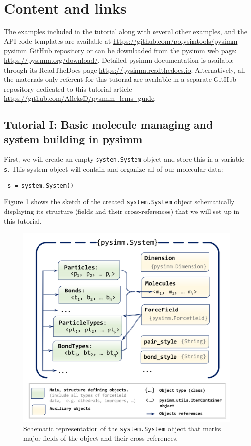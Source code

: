 \documentclass[9pt,tutorial]{livecoms}
\newcommand{\githubrepository}{\url{https://github.com/AlleksD/pysimm_lcms_guide}}
\begin{document}
\section{Content and links}
The examples included in the tutorial along with several other examples, and the API code templates are available at \url{https://github.com/polysimtools/pysimm} pysimm GitHub repository or can be downloaded from the pysimm web page: \url{https://pysimm.org/download/}. 
Detailed pysimm documentation is available through its ReadTheDocs page \url{https://pysimm.readthedocs.io}.
Alternatively, all the materials only referent for this tutorial are available in a separate GitHub repository dedicated to this tutorial article \githubrepository.  


\subsection{Tutorial I: Basic molecule managing and system building in pysimm}

First, we will create an empty \lstinline$system.System$ object and store this in a variable \lstinline$s$. This system object will contain and organize all of our molecular data:

\begin{lstlisting}
 s = system.System()
\end{lstlisting}
Figure \ref{sstm-scheme} shows the sketch of the created \lstinline$system.System$ object schematically displaying its structure (fields and their cross-references) that we will set up in this tutorial.

\begin{figure}[htbp]
  \centering
    \includegraphics[width=0.95\columnwidth]{figures/figure1}
    \caption{Schematic representation of the \lstinline$system.System$ object that marks major fields of the object and their cross-references.}
    \label{sstm-scheme}
\end{figure}
\end{document}
